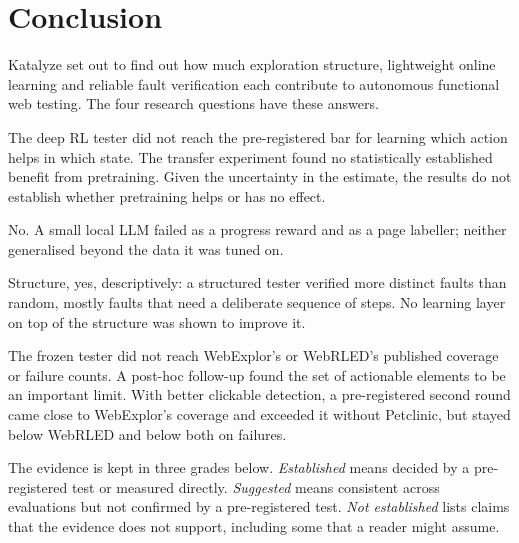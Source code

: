 \label{chap.8}

\section{Conclusion}

Katalyze set out to find out how much exploration structure, lightweight online learning
and reliable fault verification each contribute to autonomous functional web testing. The
four research questions have these answers.
\begin{description}[noitemsep]
  \item[RQ1] The deep RL tester did not reach the pre-registered bar for learning which
        action helps in which state. The transfer experiment found no statistically
        established benefit from pretraining. Given the uncertainty in the estimate, the
        results do not establish whether pretraining helps or has no effect.
  \item[RQ2] No. A small local LLM failed as a progress reward and as a page labeller; neither
        generalised beyond the data it was tuned on.
  \item[RQ3] Structure, yes, descriptively: a structured tester verified more distinct faults
        than random, mostly faults that need a deliberate sequence of steps. No learning
        layer on top of the structure was shown to improve it.
  \item[RQ4] The frozen tester did not reach WebExplor's or WebRLED's published coverage or
        failure counts. A post-hoc follow-up found the set of actionable elements to be an
        important limit. With better clickable detection, a pre-registered second round came
        close to WebExplor's coverage and exceeded it without Petclinic, but stayed below
        WebRLED and below both on failures.
\end{description}

The evidence is kept in three grades below. \emph{Established} means decided by a
pre-registered test or measured directly. \emph{Suggested} means consistent across
evaluations but not confirmed by a pre-registered test. \emph{Not established} lists claims
that the evidence does not support, including some that a reader might assume.

